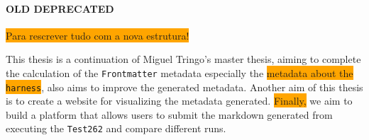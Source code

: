\documentclass[runningheads]{llncs}
\begin{document}
 

\paragraph{OLD DEPRECATED} \colorbox{orange}{Para rescrever tudo com a nova estrutura!}


This thesis is a continuation of Miguel Tringo's master thesis, aiming to complete the calculation of the \texttt{Frontmatter} metadata especially the \colorbox{orange}{metadata about the \texttt{harness}}, also aims to improve the generated metadata. Another aim of this thesis is to create a website for visualizing the metadata generated. \colorbox{orange}{Finally,} we aim to build a platform that allows users to submit the markdown generated from executing the \texttt{Test262} and compare different runs.
\end{document}
